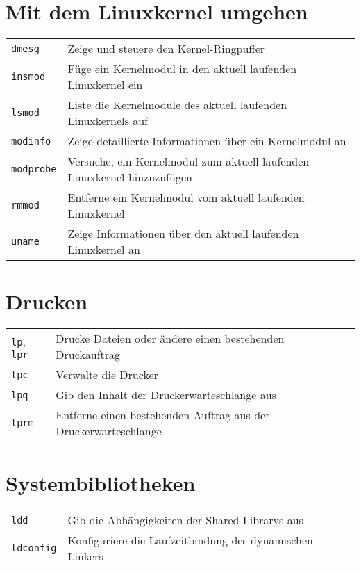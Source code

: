 \documentclass[10pt,a4paper]{article}
\begin{document}
\begin{multicols}{2}
\section{Mit dem Linuxkernel umgehen}
\begin{tabular}{ p{2.5cm} p{8.5cm} }
  \hline
  \texttt{dmesg} & Zeige und steuere den Kernel-Ringpuffer\\
  \texttt{insmod} & Füge ein Kernelmodul in den aktuell laufenden Linux\-kernel ein\\
  \texttt{lsmod} & Liste die Kernelmodule des aktuell laufenden Linux\-kernels auf\\
  \texttt{modinfo} & Zeige detaillierte Informationen über ein  Kernelmodul an\\
  \texttt{modprobe} & Versuche, ein Kernelmodul zum aktuell laufenden Linux\-kernel hinzuzufügen \\
  \texttt{rmmod} & Entferne ein Kernelmodul vom aktuell laufenden Linux\-kernel \\
  \texttt{uname} & Zeige Informationen über den aktuell laufenden \newline Linuxkernel an\\
  \hline
\end{tabular}

\section{Drucken}
\begin{tabular}{ p{2.5cm} p{8.5cm} }
  \hline
  \texttt{lp}, \texttt{lpr} & Drucke Dateien oder ändere einen bestehenden Druckauftrag\\
  \texttt{lpc} & Verwalte die Drucker \\
  \texttt{lpq} & Gib den Inhalt der Druckerwarteschlange aus\\
  \texttt{lprm} & Entferne einen bestehenden Auftrag aus der Druckerwarteschlange \\
  \hline
\end{tabular}

\section{Systembibliotheken}

\begin{tabular}{ p{2.5cm} p{8.5cm} }
  \hline 
  \texttt{ldd} & Gib die Abhängigkeiten der Shared Librarys aus \\
  \texttt{ldconfig} & Konfiguriere die Laufzeitbindung des dynamischen Linkers \\
  \hline
\end{tabular}


\end{multicols}
\end{document}
